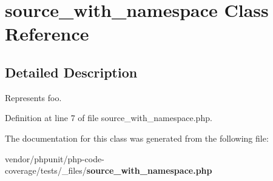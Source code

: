 \section{source\+\_\+with\+\_\+namespace Class Reference}
\label{classbar_1_1baz_1_1source__with__namespace}


\subsection{Detailed Description}
Represents foo. 

Definition at line 7 of file source\+\_\+with\+\_\+namespace.\+php.



The documentation for this class was generated from the following file\+:\begin{DoxyCompactItemize}
\item 
vendor/phpunit/php-\/code-\/coverage/tests/\+\_\+files/{\bf source\+\_\+with\+\_\+namespace.\+php}\end{DoxyCompactItemize}

